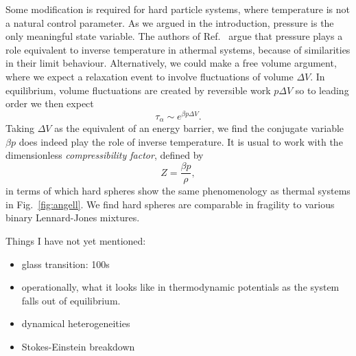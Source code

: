 Some modification is required for hard particle systems, where temperature is not a natural control parameter.
As we argued in the introduction, pressure is the only meaningful state variable.
The authors of Ref.\ \cite{BerthierPRE2009} argue that pressure plays a role equivalent to inverse temperature in athermal systems, because of similarities in their limit behaviour.
Alternatively, we could make a free volume argument, where we expect a relaxation event to involve fluctuations of volume $\Delta V$.
In equilibrium, volume fluctuations are created by reversible work $p \Delta V$ so to leading order%
we then expect
\begin{equation*}
  \tau_\alpha \sim e^{\beta p \Delta V}.
\end{equation*}
Taking $\Delta V$ as the equivalent of an energy barrier, we find the conjugate variable $\beta p$ does indeed play the role of inverse temperature.
It is usual to work with the dimensionless \emph{compressibility factor}, defined by
\begin{equation}
  Z = \frac{\beta p}{\rho},
\end{equation}
in terms of which hard spheres show the same phenomenology as thermal systems in Fig.\ \ref{fig:angell}.
We find hard spheres are comparable in fragility to various binary Lennard-Jones mixtures.

Things I have not yet mentioned:
\begin{itemize}
\item glass transition: 100s
\item operationally, what it looks like in thermodynamic potentials as the system falls out of equilibrium.
\item dynamical heterogeneities
\item Stokes-Einstein breakdown
\end{itemize}


